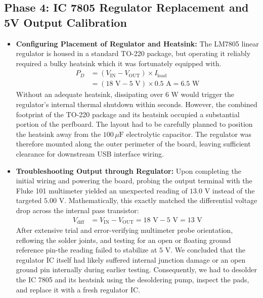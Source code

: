\documentclass[journal,12pt,onecolumn]{IEEEtran}
\begin{document}
\subsection*{\textbf{Phase 4: } IC 7805 Regulator Replacement and 5V Output Calibration}
\begin{itemize}
    \item \textbf{Configuring Placement of Regulator and Heatsink:} The LM7805 linear regulator is housed in a standard TO-220 package, but operating it reliably required a bulky heatsink which it was fortunately equipped with.
    \begin{align}
        P_D &= (V_{\text{IN}} - V_{\text{OUT}}) \times I_{\text{load}} \nonumber \\
        &= (18\text{ V} - 5\text{ V}) \times 0.5\text{ A} = 6.5\text{ W}
    \end{align}
    Without an adequate heatsink, dissipating over $6\text{ W}$ would trigger the regulator's internal thermal shutdown within seconds. However, the combined footprint of the TO-220 package and its heatsink occupied a substantial portion of the perfboard. The layout had to be carefully planned to position the heatsink away from the $100\,\mu\text{F}$ electrolytic capacitor. The regulator was therefore mounted along the outer perimeter of the board, leaving sufficient clearance for downstream USB interface wiring.

    \item \textbf{Troubleshooting Output through Regulator:} Upon completing the initial wiring and powering the board, probing the output terminal with the Fluke 101 multimeter yielded an unexpected reading of $13.0\text{ V}$ instead of the targeted $5.00\text{ V}$. Mathematically, this exactly matched the differential voltage drop across the internal pass transistor:
    \begin{align}
        V_{\text{diff}} &= V_{\text{IN}} - V_{\text{OUT}} = 18\text{ V} - 5\text{ V} = 13\text{ V}
    \end{align}
    After extensive trial and error-verifying multimeter probe orientation, reflowing the solder joints, and testing for an open or floating ground reference pin-the reading failed to stabilize at $5\text{ V}$. We concluded that the regulator IC itself had likely suffered internal junction damage or an open ground pin internally during earlier testing. Consequently, we had to desolder the IC 7805 and its heatsink using the desoldering pump, inspect the pads, and replace it with a fresh regulator IC.


\end{itemize}
\end{document}
